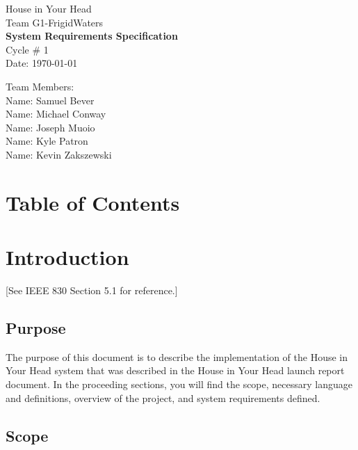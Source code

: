 \documentclass{report}
\begin{document}
\begin{titlepage}
    \begin{center}
        \begin{huge}
        House in Your Head \\[1cm]
        Team G1-FrigidWaters \\[2.2cm]
        { \bfseries System Requirements Specification } \\[1cm]
        Cycle \# 1\\[2.2cm]
        Date: \required\today\\[1cm]
        \end{huge}
    \end{center}
    \null \vfill
    \begin{large}
        Team Members: \\[0.5cm]
        Name: Samuel Bever\\[0.5cm]
        Name: Michael Conway\\[0.5cm]
        Name: Joseph Muoio\\[0.5cm]
        Name: Kyle Patron\\[0.5cm]
        Name: Kevin Zakszewski
    \end{large}
\end{titlepage}

\section*{\centering Table of Contents}

\newpage

\section{Introduction}

[See IEEE 830 Section 5.1 for reference.]

\subsection{Purpose}
The purpose of this document is to describe the implementation of the House in Your Head system that 
was described in the House in Your Head launch report document. In the proceeding sections, you will 
find the scope, necessary language and definitions, overview of the project, and system requirements 
defined.

\subsection{Scope}
\end{document}
